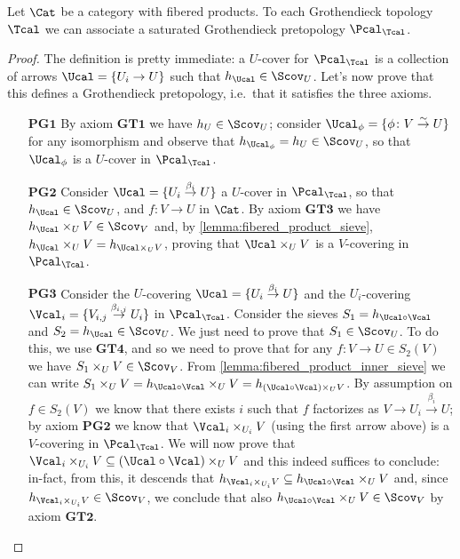 \documentclass[a4paper]{article}
\begin{document}
            \begin{thm}
                \label{thm:top_to_pretop}
                Let $\Cat$ be a category with fibered products. To each Grothendieck topology $\Tcal$ we can associate a saturated Grothendieck pretopology $\Pcal_{\Tcal}$.
            \end{thm}
            \begin{proof}
                The definition is pretty immediate: a $U$-cover for $\Pcal_{\Tcal}$ is a collection of arrows $\Ucal = \{U_i \to U\}$ such that $h_{\Ucal} \in \Scov_U$. Let's now prove that this defines a Grothendieck pretopology, i.e.\ that it satisfies the three axioms.
                \begin{enumerate}
                    \item[$\mathbf{PG1}$] By axiom $\mathbf{GT1}$ we have $h_U \in \Scov_U$; consider $\Ucal_{\phi} = \{\phi\colon V \stackrel{\sim}{\to} U \}$ for any isomorphism and observe that $h_{\Ucal_{\phi}} = h_U \in \Scov_U$, so that $\Ucal_{\phi}$ is a $U$-cover in $\Pcal_{\Tcal}$.
                    \item[$\mathbf{PG2}$] Consider $\Ucal = \{U_i \stackrel{\beta_i}{\to} U\}$ a $U$-cover in $\Pcal_{\Tcal}$, so that $h_{\Ucal} \in \Scov_U$, and $f\colon V \to U$ in $\Cat$. By axiom $\mathbf{GT3}$ we have $h_{\Ucal} \times_U V \in \Scov_V$ and, by \cref{lemma:fibered_product_sieve}, $h_{\Ucal} \times_U V = h_{\Ucal \times_U V}$, proving that $\Ucal \times_U V$ is a $V$-covering in $\Pcal_{\Tcal}$.
                    \item[$\mathbf{PG3}$] Consider the $U$-covering $\Ucal = \{U_i \stackrel{\beta_i}{\to} U\}$ and the $U_i$-covering $\Vcal_i = \{V_{i,j} \stackrel{\beta_{i,j}}{\to} U_i\}$  in $\Pcal_{\Tcal}$. Consider the sieves $S_1 = h_{\Ucal \circ \Vcal}$ and $S_2 = h_{\Ucal} \in \Scov_U$. We just need to prove that $S_1 \in \Scov_U$. To do this, we use $\mathbf{GT4}$, and so we need to prove that for any $f\colon V \to U \in S_2(V)$ we have $S_1 \times_U V \in \Scov_V$. From \cref{lemma:fibered_product_inner_sieve} we can write $S_1 \times_U V = h_{\Ucal \circ \Vcal} \times_U V = h_{(\Ucal \circ \Vcal) \times_U V}$. By assumption on $f \in S_2(V)$ we know that there exists $i$ such that $f$ factorizes as $V \to U_i \stackrel{\beta_i}{\to} U$; by axiom $\mathbf{PG2}$ we know that $\Vcal_i \times_{U_i} V$ (using the first arrow above) is a $V$-covering in $\Pcal_{\Tcal}$. We will now prove that $\Vcal_i \times_{U_i} V \subseteq (\Ucal \circ \Vcal) \times_U V$ and this indeed suffices to conclude: in-fact, from this, it descends that $h_{\Vcal_i \times_{U_i} V} \subseteq h_{\Ucal \circ \Vcal} \times_U V$ and, since $h_{\Vcal_i \times_{U_i} V} \in \Scov_V$, we conclude that also $h_{\Ucal \circ \Vcal} \times_U V \in \Scov_V$ by axiom $\mathbf{GT2}$.

\end{enumerate}
\end{proof}
\end{document}
